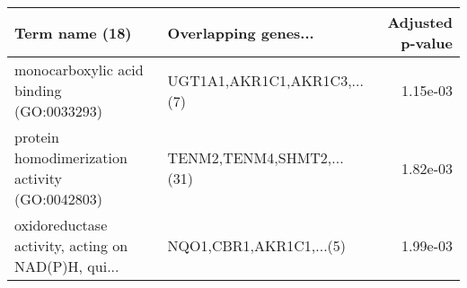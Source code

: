 \begin{tabular}{llr}
\toprule
                                    Term name (18) &        Overlapping genes... &  Adjusted p-value \\
\midrule
          monocarboxylic acid binding (GO:0033293) & UGT1A1,AKR1C1,AKR1C3,...(7) &          1.15e-03 \\
    protein homodimerization activity (GO:0042803) &   TENM2,TENM4,SHMT2,...(31) &          1.82e-03 \\
oxidoreductase activity, acting on NAD(P)H, qui... &     NQO1,CBR1,AKR1C1,...(5) &          1.99e-03 \\
\bottomrule
\end{tabular}
